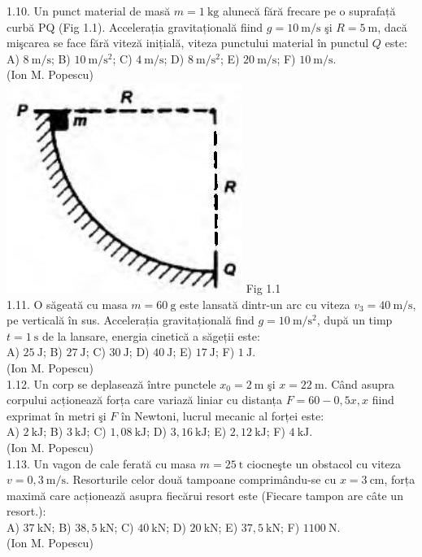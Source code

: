 1.10. Un punct material de masă $m=1 \mathrm{~kg}$ alunecă fără frecare pe o suprafață curbă PQ (Fig 1.1). Accelerația gravitațională fiind $g=10 \mathrm{~m} / \mathrm{s}$ şi $R=5 \mathrm{~m}$, dacă mişcarea se face fără viteză inițială, viteza punctului material în punctul $Q$ este:\\ A) $8 \mathrm{~m} / \mathrm{s}$; B) $10 \mathrm{~m} / \mathrm{s}^{2}$; C) $4 \mathrm{~m} / \mathrm{s}$; D) $8 \mathrm{~m} / \mathrm{s}^{2}$; E) $20 \mathrm{~m} / \mathrm{s}$; F) $10 \mathrm{~m} / \mathrm{s}$.\\ (Ion M. Popescu)\\ \includegraphics[width=0.4\linewidth]{images/2025_07_01_5b3ff9fa0d508c8e9f17g-004} Fig 1.1\\

1.11. O săgeată cu masa $m=60 \mathrm{~g}$ este lansată dintr-un arc cu viteza $v_{3}=40 \mathrm{~m} / \mathrm{s}$, pe verticală în sus. Accelerația gravitațională find $g=10 \mathrm{~m} / \mathrm{s}^{2}$, după un timp $t=1 \mathrm{~s}$ de la lansare, energia cinetică a săgeții este:\\ A) $25 \mathrm{~J}$; B) $27 \mathrm{~J}$; C) $30 \mathrm{~J}$; D) $40 \mathrm{~J}$; E) $17 \mathrm{~J}$; F) $1 \mathrm{~J}$.\\ (Ion M. Popescu)\\

1.12. Un corp se deplasează între punctele $x_{0}=2 \mathrm{~m}$ şi $x=22 \mathrm{~m}$. Când asupra corpului acționează forța care variază liniar cu distanța $F=60-0,5 x, x$ fiind exprimat în metri şi $F$ în Newtoni, lucrul mecanic al forței este:\\ A) $2 \mathrm{~kJ}$; B) $3 \mathrm{~kJ}$; C) $1,08 \mathrm{~kJ}$; D) $3,16 \mathrm{~kJ}$; E) $2,12 \mathrm{~kJ}$; F) $4 \mathrm{~kJ}$.\\ (Ion M. Popescu)\\

1.13. Un vagon de cale ferată cu masa $m=25 \mathrm{~t}$ ciocneşte un obstacol cu viteza $v=0,3 \mathrm{~m} / \mathrm{s}$. Resorturile celor două tampoane comprimându-se cu $x=3 \mathrm{~cm}$, forța maximă care acționează asupra fiecărui resort este (Fiecare tampon are câte un resort.):\\ A) $37 \mathrm{~kN}$; B) $38,5 \mathrm{~kN}$; C) $40 \mathrm{~kN}$; D) $20 \mathrm{~kN}$; E) $37,5 \mathrm{~kN}$; F) $1100 \mathrm{~N}$.\\ (Ion M. Popescu)\\


